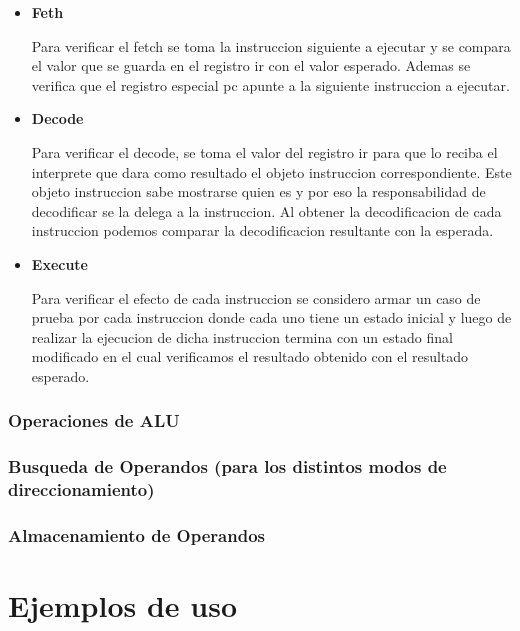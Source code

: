 \begin{itemize}
\item \textbf{Feth} 

Para verificar el fetch se toma la instruccion siguiente a ejecutar y se compara el valor que se guarda en el registro ir con el valor esperado. Ademas se verifica que el registro especial pc apunte a la siguiente instruccion a ejecutar.

\item \textbf{Decode}

Para verificar el decode, se toma el valor del registro ir para que lo reciba el interprete que dara como resultado el objeto instruccion correspondiente. Este objeto instruccion sabe mostrarse quien es y por eso la responsabilidad de decodificar se la delega a la instruccion. Al obtener la decodificacion de cada instruccion podemos comparar la decodificacion resultante con la esperada.
 
\item \textbf{Execute}

Para verificar el efecto de cada instruccion se considero armar un caso de prueba por cada instruccion donde cada uno tiene un estado inicial y luego de realizar la ejecucion de dicha instruccion termina con un estado final modificado en el cual verificamos el resultado obtenido con el resultado esperado. 

\end{itemize}
  
\subsubsection{Operaciones de ALU}

\subsubsection{Busqueda de Operandos (para los distintos modos de direccionamiento)}

\subsubsection{Almacenamiento de Operandos}
\section{Ejemplos de uso}
